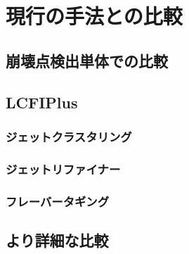 
\chapter{現行の手法との比較} \label{chap:Comparison}


\section{崩壊点検出単体での比較} \label{Com:ComparisonwithVF}

\section{LCFIPlus} \label{Com:LCFIPlus}

\subsection{ジェットクラスタリング} \label{Com:LCFIPlus:JetClustering}

\subsection{ジェットリファイナー} \label{Com:LCFIPlus:JetRefiner}

\subsection{フレーバータギング} \label{Com:LCFIPlus:FlavorTagging}


\section{より詳細な比較} \label{Com:FlavorTaggingComparison}




























